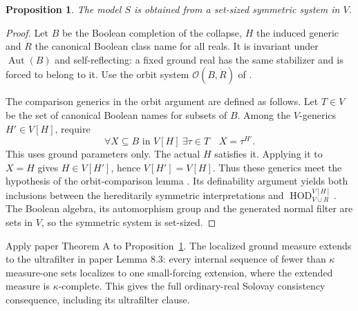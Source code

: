 \documentclass[11pt,a4paper]{amsart}
\newcommand{\HOD}{\ensuremath{\operatorname{HOD}}}
\newtheorem{proposition}[theorem]{Proposition}
\begin{document}
\begin{proposition}\label{prop:symmetric}
The model $S$ is obtained from a set-sized symmetric system in $V$.
\end{proposition}
\begin{proof}
Let $B$ be the Boolean completion of the collapse, $H$ the induced generic and $\dot R$ the canonical Boolean class name for all reals. It is invariant under $\operatorname{Aut}(B)$ and self-reflecting: a fixed ground real has the same stabilizer and is forced to belong to it. Use the orbit system $\mathcal O(B,\dot R)$ of \cite[Definitions 9.1--9.2 and Proposition 9.4]{KaragilaSchilhan}.

The comparison generics in the orbit argument are defined as follows. Let $T\in V$ be the set of canonical Boolean names for subsets of $B$. Among the $V$-generics $H'\in V[H]$, require
\[
\forall X\subseteq B\text{ in }V[H]\ \exists\tau\in T\quad X=\tau^{H'}.
\]
This uses ground parameters only. The actual $H$ satisfies it. Applying it to $X=H$ gives $H\in V[H']$, hence $V[H']=V[H]$. Thus these generics meet the hypothesis of the orbit-comparison lemma \cite[Lemma 9.3]{KaragilaSchilhan}. Its definability argument yields both inclusions between the hereditarily symmetric interpretations and $\HOD_{V\cup R}^{V[H]}$. The Boolean algebra, its automorphism group and the generated normal filter are sets in $V$, so the symmetric system is set-sized.
\end{proof}

Apply paper Theorem A to Proposition~\ref{prop:symmetric}. The localized ground measure extends to the ultrafilter in paper Lemma 8.3: every internal sequence of fewer than $\kappa$ measure-one sets localizes to one small-forcing extension, where the extended measure is $\kappa$-complete. This gives the full ordinary-real Solovay consistency consequence, including its ultrafilter clause.
\end{document}
